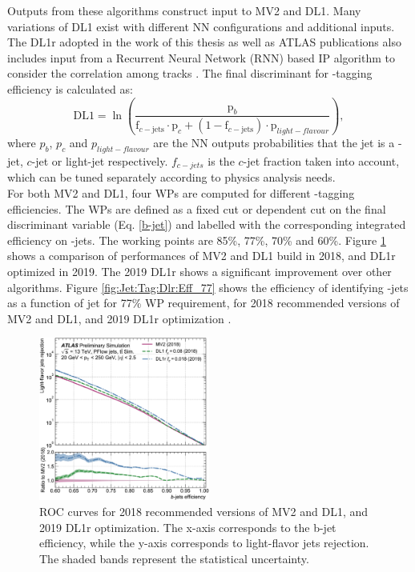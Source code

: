 Outputs from these algorithms construct input to MV2 and DL1. Many variations of DL1 exist with different NN configurations and additional inputs. The DL1r adopted in the work of this thesis as well as ATLAS publications also includes input from a Recurrent Neural Network (RNN) based IP algorithm to consider the correlation among tracks \cite{DL1r}. The final discriminant for \bq-tagging efficiency is calculated as:
\begin{equation}
    \mathrm{DL} 1=\ln \left(\frac{\mathrm{p}_{b}}{\mathrm{f}_{c-\mathrm{jets}} \cdot \mathrm{p}_{c}+\left(1-\mathrm{f}_{c-\mathrm{jets}}\right) \cdot \mathrm{p}_{light-flavour }}\right),
    \label{b-jet}
\end{equation}
where $p_b$, $p_c$ and $p_{light-flavour}$ are the NN outputs probabilities that the jet is a \bq-jet, $c$-jet or light-jet respectively. $f_{c-jets}$ is the $c$-jet fraction taken into account, which can be tuned separately according to physics analysis needs. \\  
For both MV2 and DL1, four WPs are computed for different \bq-tagging efficiencies. The WPs are defined as a fixed cut or \pT dependent cut on the final discriminant variable (Eq. \ref{b-jet}) and labelled with the corresponding integrated efficiency on \bq-jets. The working points are 85\%, 77\%, 70\% and 60\%. Figure \ref{fig:Jet:Tag:Dlr:Eff} shows a comparison of performances of MV2 and DL1 build in 2018, and DL1r optimized in 2019. The 2019 DL1r shows a significant improvement over other algorithms. Figure \ref{fig:Jet:Tag:Dlr:Eff_77} shows the efficiency of identifying \bq-jets as a function of jet \pT for 77\% WP requirement, for 2018 recommended versions of MV2 and DL1, and 2019 DL1r optimization \cite{Btag_Perf}. 
\begin{figure}[htbp]
    \centering
    \includegraphics[width=0.5\textwidth]{Ch4/Img/b_jet_Eff.png}
    \caption{ROC curves for 2018 recommended versions of MV2 and DL1, and 2019 DL1r optimization. The x-axis corresponds to the b-jet efficiency, while the y-axis corresponds to light-flavor jets rejection. The shaded bands represent the statistical uncertainty.}
    \label{fig:Jet:Tag:Dlr:Eff}
\end{figure}
